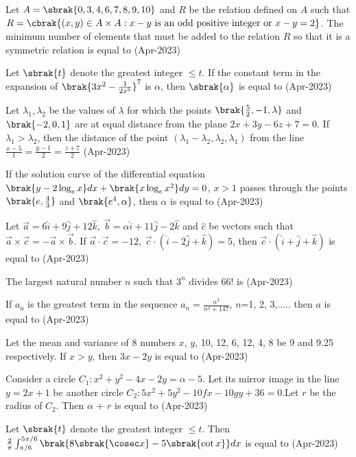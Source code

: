 \iffalse
\title{2023}
\author{EE24BTECH11033}
\section{integer}
\fi
\item   Let $A = \sbrak{0, 3, 4, 6, 7, 8, 9, 10}$ and $R$ be the relation defined on $A$ such that $R = \cbrak{(x, y) \in A \times A : x - y \text{ is an odd positive integer or } x - y = 2 }$. The minimum number of elements that must be added to the relation $R$ so that it is a symmetric relation is equal to 
\hfill(Apr-2023)
\item Let $\sbrak{t}$ denote the greatest integer $\leq t$. If the constant term in the expansion of $\brak{3x^2 - \frac{1}{2x^5}}^7$ is $\alpha$, then $\sbrak{\alpha}$  is equal to 
\hfill(Apr-2023)
\item Let $\lambda_1, \lambda_2$ be the values of $\lambda$ for which the points 
$\brak{\frac{5}{2}, -1, \lambda}$ and $\brak{-2, 0, 1}$ 
are at equal distance from the plane $2x + 3y - 6z + 7 = 0$. 
If $\lambda_1 > \lambda_2$, then the distance of the point $(\lambda_1 - \lambda_2, \lambda_2, \lambda_1)$ 
from the line $\frac{x - 5}{1} = \frac{y - 1}{2} = \frac{z + 7}{2}$
\hfill(Apr-2023)
\item If the solution curve of the differential equation $\brak{y - 2 \log_e x}dx + \brak{x \log_e x^2}dy = 0$, $x > 1$ passes through the points $\brak{e, \frac{4}{3}}$ and  $\brak{e^4, \alpha}$, then $\alpha$ is equal to 
\hfill(Apr-2023)
\item Let \(\vec{a} = 6\hat{i} + 9\hat{j} + 12\hat{k}, \ \vec{b} = \alpha\hat{i} + 11\hat{j} - 2\hat{k}\) and \(\hat{c}\) be vectors such that \(\vec{a} \times \vec{c} = -\vec{a} \times \vec{b}\). If \(\vec{a} \cdot \vec{c} = -12, \ \vec{c} \cdot (\hat{i} - 2\hat{j} + \hat{k}) = 5\), then \(\vec{c} \cdot (\hat{i} + \hat{j} + \hat{k})\) is equal to 
\hfill(Apr-2023)
\item The largest natural number $n$ such that $3^n$ divides 66! is
\hfill(Apr-2023)
\item If $a_a$ is the greatest term in the sequence $a_n=\frac{n^3}{n^4 + 147}$, $n$=1, 2, 3,..... then $a$ is equal to \hfill(Apr-2023)
\item Let the mean and variance of 8 numbers $x$, $y$, 10, 12, 6, 12, 4, 8 be 9 and 9.25 respectively. If $x>y$, then $3x-2y$ is equal to 
\hfill(Apr-2023)
\item Consider a circle $C_1 : x^2+y^2-4x-2y=\alpha-5$. Let its mirror  image in the line $y=2x+1$ be another circle $C_2 : 5x^2+5y^2 -10fx-10gy+36=0 $.Let $r$ be the radius of $C_2$. Then $\alpha$ + $r$ is equal to
\hfill(Apr-2023)
\item Let $\sbrak{t}$ denote the greatest integer $\leq t$. Then $\frac{2}{\pi} \int_{\pi/6}^{5\pi/6} \brak{8\sbrak{\cosec x} - 5\sbrak{\cot x} } dx$ is equal to 
\hfill(Apr-2023)

